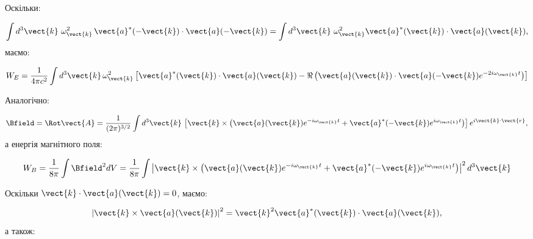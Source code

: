 Оскільки:

\begin{equation*}
	\int d^3\vect{k}\ \omega^2_{\vect{k}} \, \vect{a}^*(-\vect{k}) \cdot \vect{a}(-\vect{k}) = \int d^3\vect{k} \ \omega^2_{\vect{k}}  \vect{a}^*(\vect{k}) \cdot \vect{a}(\vect{k}),
\end{equation*}
маємо:

\begin{equation}
	W_E = \frac{1}{4\pi c^2} \int d^3\vect{k} \, \omega_{\vect{k}}^2 \left[ \vect{a}^*(\vect{k}) \cdot \vect{a}(\vect{k}) - \Re \left( \vect{a}(\vect{k})
		\cdot \vect{a}(-\vect{k}) e^{-2i\omega_{\vect{k}} t} \right) \right]
	\label{eq:W_E_final}
\end{equation}

Аналогічно:

\begin{equation*}
	\Bfield = \Rot\vect{A} = \frac{1}{(2\pi)^{3/2}} \int d^3\vect{k} \, \left[ \vect{k} \times \left( \vect{a}(\vect{k}) e^{-i\omega_{\vect{k}} t} +
		\vect{a}^*(-\vect{k}) e^{i\omega_{\vect{k}} t} \right) \right] e^{i\vect{k} \cdot \vect{r}},
\end{equation*}
а енергія магнітного поля:

\begin{equation*}
	W_B = \frac{1}{8\pi} \int \Bfield^2 dV  = \frac{1}{8\pi} \int \left| \vect{k} \times \left( \vect{a}(\vect{k}) e^{-i\omega_{\vect{k}} t} +
	\vect{a}^*(-\vect{k}) e^{i\omega_{\vect{k}} t} \right) \right|^2 d^3\vect{k}
	\label{eq:W_B}
\end{equation*}

Оскільки \(\vect{k} \cdot \vect{a}(\vect{k}) = 0\), маємо:

\begin{equation*}
	\left| \vect{k} \times \vect{a}(\vect{k}) \right|^2 = \vect{k}^2 \vect{a}^*(\vect{k}) \cdot \vect{a}(\vect{k}),
\end{equation*}
а також:

